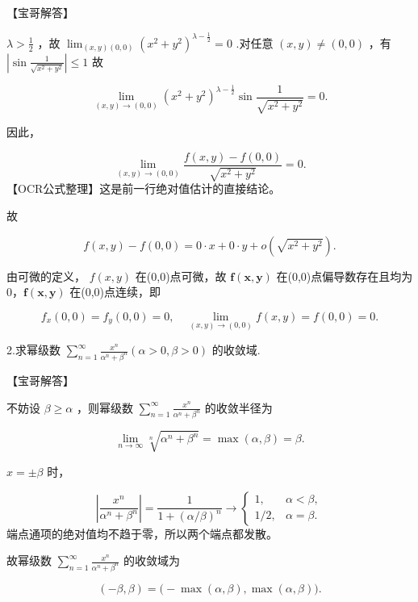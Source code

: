 \documentclass[11pt,fontset=fandol]{ctexart}
\begin{document}
【宝哥解答】

\(\lambda > \frac { 1 } { 2 }\) ，故
\(\lim _ { ( x , y )  ( 0 , 0 ) } ( x ^ { 2 } + y ^ { 2 } ) ^ { \lambda - \frac { 1 } { 2 } } = 0\)
.对任意 \(( x , y ) \neq ( 0 , 0 )\) ，有
\(\left| \sin \frac { 1 } { \sqrt { x ^ { 2 } + y ^ { 2 } } } \right| \leq 1\)
故

\[
\lim _ { ( x , y ) \to ( 0 , 0 ) } ( x ^ { 2 } + y ^ { 2 } ) ^ { \lambda - \frac { 1 } { 2 } } \sin \frac { 1 } { \sqrt { x ^ { 2 } + y ^ { 2 } } } = 0 .
\]

因此，

\[
\lim_{(x,y)\to(0,0)}
\frac{f(x,y)-f(0,0)}{\sqrt{x^2+y^2}}=0.
\] 【OCR公式整理】这是前一行绝对值估计的直接结论。

故

\[
f ( x , y ) - f ( 0 , 0 ) = 0 \cdot x + 0 \cdot y + o ( \sqrt { x ^ { 2 } + y ^ { 2 } } ) .
\]

由可微的定义， \(\scriptstyle f ( x , y )\) 在(0,0)点可微，故
\(\pmb { f } ( \pmb { x } , \pmb { y } )\)
在(0,0)点偏导数存在且均为0，\(\pmb { f } ( \pmb { x } , \pmb { y } )\)
在(0,0)点连续，即

\[
f _ { x } ( 0 , 0 ) = f _ { y } ( 0 , 0 ) = 0 , \quad \lim _ { ( x , y ) \to ( 0 , 0 ) } f ( x , y ) = f ( 0 , 0 ) = 0 .
\]

2.求幂级数
\(\sum _ { n = 1 } ^ { \infty } { \frac { x ^ { n } } { \alpha ^ { n } + \beta ^ { n } } } \left( \alpha > 0 , \beta > 0 \right)\)
的收敛域.

【宝哥解答】

不妨设 \(\beta \geq \alpha\) ，则幂级数
\(\sum \limits _ { n = 1 } ^ { \infty } \frac { x ^ { n } } { \alpha ^ { n } + \beta ^ { n } }\)
的收敛半径为

\[
\lim _ { n \to \infty } \sqrt [ n ] { \alpha ^ { n } + \beta ^ { n } } = \operatorname* { m a x } ( \alpha , \beta ) = \beta .
\]

\(\scriptstyle x = \pm \beta\) 时，

\[
\left|\frac{x^n}{\alpha^n+\beta^n}\right|
=\frac1{1+(\alpha/\beta)^n}\longrightarrow
\begin{cases}
1,&\alpha<\beta,\\
1/2,&\alpha=\beta.
\end{cases}
\] 端点通项的绝对值均不趋于零，所以两个端点都发散。

故幂级数
\(\sum _ { n = 1 } ^ { \infty } { \frac { x ^ { n } } { \alpha ^ { n } + \beta ^ { n } } }\)
的收敛域为

\[
( - \beta , \beta ) = \big ( - \operatorname* { m a x } ( \alpha , \beta ) , \operatorname* { m a x } ( \alpha , \beta ) \big ) .
\]
\end{document}
